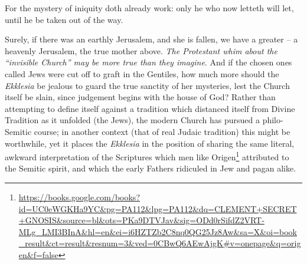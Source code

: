 \begin{quotex}
For the mystery of iniquity doth already work: only he who now letteth will let, until he be taken out of the way.
\end{quotex}


Surely, if there was an earthly Jerusalem, and she is fallen, we have a greater -- a heavenly Jerusalem, the true mother above. \emph{The Protestant whim about the ``invisible Church'' may be more true than they imagine}. And if the chosen ones called Jews were cut off to graft in the Gentiles, how much more should the \emph{Ekklesia} be jealous to guard the true sanctity of her mysteries, lest the Church itself be slain, since judgement begins with the house of God? Rather than attempting to define itself against a tradition which distanced itself from Divine Tradition as it unfolded (the Jews), the modern Church has pursued a philo-Semitic course; in another context (that of real Judaic tradition) this might be worthwhile, yet it places the \emph{Ekklesia} in the position of sharing the same literal, awkward interpretation of the Scriptures which men like Origen\footnote{\url{https://books.google.com/books?id=UC0eWGKHa9YC&pg=PA112\&lpg=PA112\&dq=CLEMENT+SECRET+GNOSIS\&source=bl\&ots=PKa9DTVJav\&sig=ODd0rSifdZ2VRT-MLg\_LMI3BInA\&hl=en\&ei=i6HZTZb2C8nq0QG25Jz8Aw\&sa=X\&oi=book\_result\&ct=result\&resnum=3\&ved=0CBwQ6AEwAjgK\#v=onepage\&q=origen\&f=false}} attributed to the Semitic spirit, and which the early Fathers ridiculed in Jew and pagan alike.



